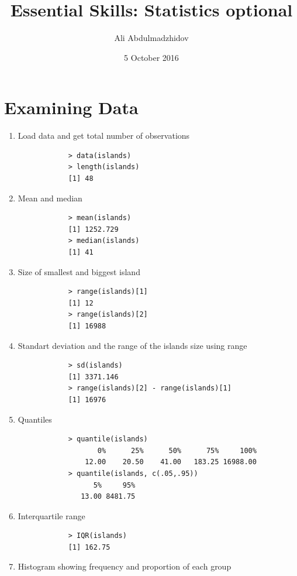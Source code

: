 \documentclass[10pt]{article}
\title{Essential Skills: Statistics optional}
\date{5 October 2016}
\author{Ali Abdulmadzhidov}
\begin{document}
\renewcommand*\rmdefault{cmss}
\maketitle

\section{Examining Data}
\begin{enumerate}
    \item Load data and get total number of observations
        \begin{verbatim}
            > data(islands)
            > length(islands)
            [1] 48
        \end{verbatim}
    \item Mean and median
        \begin{verbatim}
            > mean(islands)
            [1] 1252.729
            > median(islands)
            [1] 41
        \end{verbatim}
    \item Size of smallest and biggest island
        \begin{verbatim}
            > range(islands)[1]
            [1] 12
            > range(islands)[2]
            [1] 16988
        \end{verbatim}
    \item Standart deviation and the range of the islands size using range
        \begin{verbatim}
            > sd(islands)
            [1] 3371.146
            > range(islands)[2] - range(islands)[1]
            [1] 16976
        \end{verbatim}
    \item Quantiles
        \begin{verbatim}
            > quantile(islands)
                   0%      25%      50%      75%     100% 
                12.00    20.50    41.00   183.25 16988.00
            > quantile(islands, c(.05,.95))
                  5%     95% 
               13.00 8481.75
        \end{verbatim}
    \item Interquartile range
        \begin{verbatim}
            > IQR(islands)
            [1] 162.75
        \end{verbatim}
    \item Histogram showing frequency and proportion of each group
        \begin{verbatim}

\end{verbatim}
\end{enumerate}
\end{document}
